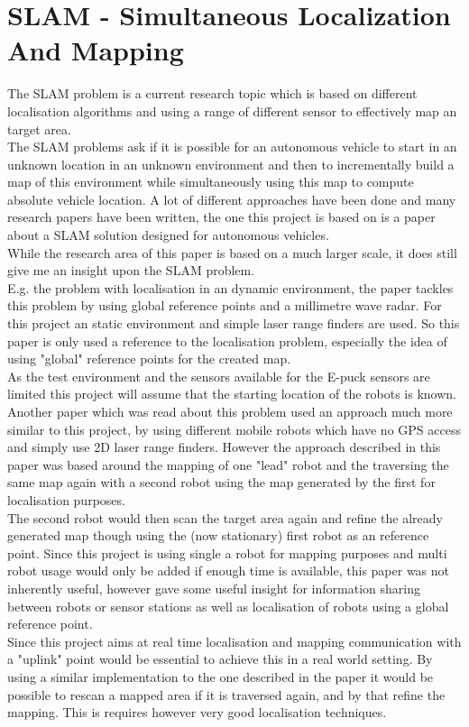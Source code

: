 \section{SLAM - Simultaneous Localization And Mapping}
The SLAM problem is a current research topic which is based on different localisation algorithms and using a range of different sensor to effectively map an target area. \\
The SLAM problems ask if it is possible for an autonomous vehicle to start in an unknown location in an unknown environment and then to incrementally build a map of this environment while simultaneously using this map to compute absolute vehicle location\cite{Dissanayake2001Solution}.
A lot of different approaches have been done and many research papers have been written, the one this project is based on is a paper about a SLAM solution designed for autonomous vehicles\cite{Dissanayake2001Solution}.\\
While the research area of this paper is based on a much larger scale, it does still give me an insight upon the SLAM problem.\\
E.g. the problem with localisation in an dynamic environment, the paper tackles this problem by using global reference points and a millimetre wave radar. For this project an static environment and simple laser range finders are used. So this paper is only used a reference to the localisation problem, especially the idea of using "global" reference points for the created map.\\
As the test environment and the sensors available for the E-puck sensors are limited this project will assume that the starting location of the robots is known.\\[3ex]

Another paper which was read about this problem used an approach much more similar to this project, by using different mobile robots which have no GPS access and simply use 2D laser range finders. However the approach described in this paper was based around the mapping of one "lead" robot and the traversing the same map again with a second robot using the map generated by the first for localisation purposes.\\
The second robot would then scan the target area again and refine the already generated map though using the (now stationary) first robot as an reference point. Since this project is using single a robot for mapping purposes and multi robot usage would only be added if enough time is available, this paper was not inherently useful, however gave some useful insight for information sharing between robots or sensor stations as well as localisation of robots using a global reference point.\\
Since this project aims at real time localisation and mapping communication with a "uplink" point would be essential to achieve this in a real world setting. By using a similar implementation to the one described in the paper it would be possible to rescan a mapped area if it is traversed again, and by that refine the mapping. This is requires however very good localisation techniques.


